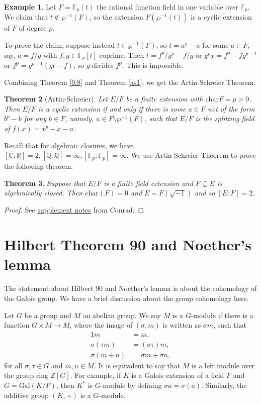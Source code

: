 \documentclass[12pt]{report}
\newtheorem{theorem}{Theorem}[section]
\theoremstyle{definition}
\newtheorem{example}[theorem]{Example}
\newcommand{\cc}{\mathbb{C}}
\newcommand{\ff}{\mathbb{F}}
\newcommand{\qq}{\mathbb{Q}}
\newcommand{\charr}{\text{char}}
\newcommand{\Gal}{\text{Gal}}
\newcommand{\gm}{$G$-module}
\newcommand{\ZZ}{\mathbb{Z}}
\newcommand{\RR}{\mathbb{R}}
\newcommand{\FF}{\mathbb{F}}
\begin{document}
\begin{example}
	Let $F=\FF_p(t)$ the rational function field in one variable over $\FF_p$. We claim that $t\notin \wp^{-1}(F)$, so the extension $F(\wp^{-1}(t))$ is a cyclic extension of $F$ of degree $p$.

	To prove the claim, suppose instead $t\in \wp^{-1}(F)$, so $t=a^p-a$ for some $a\in F$, say, $a=f/g$ with $f,g\in \FF_p[t]$ coprime. Then $t=f^p/g^p-f/g$ or $g^px=f^p-fg^{p-1}$ or $f^p=g^{p-1}(gt-f)$, so $g$ divides $f^p$. This is impossible.
\end{example}

\noindent Combining Theorem \ref{9.8} and Theorem \ref{as1}, we get the Artin-Schreier Theorem.

\begin{theorem}[Artin-Schreier]
	Let $E/F$ be a finite extension with $\charr{F}=p>0$. Then $E/F$ is a cyclic extension if and only if there is some $a\in F$ not of the form $b^p-b$ for any $b\in F$, namely, $a\in F\setminus \wp^{-1}(F)$, such that $E/F$ is the splitting field of $f(x)=x^p-x-a$.
\end{theorem}

Recall that for algebraic closures, we have $[\cc:\RR]=2, [\overline{\qq}:\qq]=\infty, [\overline{\ff_p}:\ff_p]=\infty$. We use Artin-Schreier Theorem to prove the following theorem.

\begin{theorem}
	Suppose that $E/F$ is a finite field extension and $F\subsetneq E$ is algebraically closed. Then $\charr(F)=0$ and $E=F(\sqrt{-1})$ and so $[E:F]=2$.
\end{theorem}

\begin{proof}
	See \href{https://kconrad.math.uconn.edu/blurbs/galoistheory/artinschreier.pdf}{supplement notes} from Conrad.
\end{proof}

\section{Hilbert Theorem 90 and Noether's lemma}

The statement about Hilbert 90 and Noether's lemma is about the cohomology of the Galois group. We have a brief discussion about the group cohomology here.

Let $G$ be a group and $M$ an abelian group. We say $M$ is a $G$-module if there is a function $G\times M\to M$, where the image of $(\sigma,m)$ is written as $\sigma m$, such that \begin{align*}
	1m             & = m,                 \\
	\sigma(\tau m) & =(\sigma\tau)m,      \\
	\sigma(m+n)    & =\sigma m +\sigma n,
\end{align*}
for all $\sigma,\tau\in G$ and $m,n\in M$. It is equivalent to say that $M$ is a left module over the group ring $\ZZ[G]$. For example, if $K$ is a Galois extension of a field $F$ and $G=\Gal(K/F)$, then $K^*$ is $G$-module by defining $\sigma a=\sigma(a)$. Similarly, the additive group $(K,+)$ is a \gm.
\end{document}
